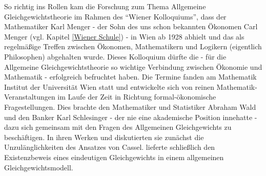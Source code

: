 So richtig ins Rollen kam die Forschung zum Thema Allgemeine Gleichgewichtstheorie im Rahmen des "`Wiener Kolloquiums"', dass der Mathematiker Karl Menger - der Sohn des uns schon bekannten Ökonomen Carl Menger (vgl. Kapitel \ref{Wiener Schule}) -  in Wien ab 1928 abhielt und das als regelmäßige Treffen zwischen Ökonomen, Mathematikern und Logikern (eigentlich Philosophen) abgehalten wurde. Dieses Kolloquium dürfte die - für die Allgemeine Gleichgewichtstheorie so wichtige Verbindung zwischen Ökonomie und Mathematik - erfolgreich befruchtet haben. Die Termine fanden am Mathematik Institut der Universität Wien statt und entwickelte sich von reinen Mathematik-Veranstaltungen im Laufe der Zeit in Richtung formal-ökonomische Fragestellungen. Dies brachte den Mathematiker und Statistiker Abraham Wald und den Banker Karl Schlesinger - der nie eine akademische Position innehatte - dazu sich gemeinsam mit den Fragen des Allgemeinen Gleichgewichts zu beschäftigen. In ihren Werken \textcite{Wald1934} und \textcite{Schlesinger1934} diskutierten sie zunächst die Unzulänglichkeiten des Ansatzes von Cassel. \textcite{Wald1935} lieferte schließlich den Existenzbeweis eines eindeutigen Gleichgewichts in einem allgemeinen Gleichgewichtsmodell.

